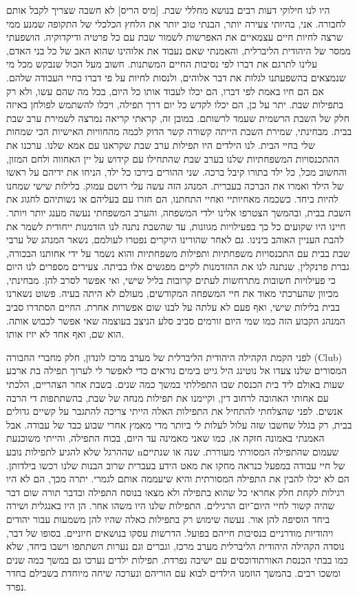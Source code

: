 \documentclass[14pt, article, extrafontsizes, twopage, a4paper]{memoir}
\begin{document}
היו לנו חילוקי דעות רבים בנושא מחללי שבת. [מיס הריס] לא חשבה שצריך לקבל אותם לחבורה. אני, בהיותי צעירה יותר, הבנתי טוב יותר את הלחץ הכלכלי של התקופה שמנע ממי שרצה לחיות חיים עצמאיים את האפרשות לשמור שבת עם כל פרטיה ודיקדוקיה. הושפעתי ממסר של היהודית הליברלית, והאמנתי שאם נעבוד את אלוהינו שהוא האב של כל בני האדם, עלינו לתרגם את דברו לפי נסיבות החיים המשתנות. חשוב מעל הכול שנבקש מכל מי שנמצאים בהשפעתנו לגלות את דבר אלוהים, ולנסות לחיות על פי דברו בחיי העבודה שלהם. אם הם חיו באמת לפי דברו, הם יכלו לעבוד אותו כל היום, בכל מה שהם עשו, ולא רק בתפילות שבת. יתר על כן, הם יכלו לקדש כל יום דרך תפילה, ויכלו להשתמש לפולחן באיזה חלק של השבת הרשמית שעמד לרשותם. במובן זה, קראתי קריאה נמרצה לשמירת ערב שבת בבית. מבחינתי, שמירת השבת הייתה קשורה קשר הדוק לכמה מהחוויות האישיות הכי שמחות שלי בחיי הבית. לנו הילדים היו תפילות ערב שבת שקראנו עם אמא שלנו. ערכנו את ההתכנסויות המשפחתיות שלנו בערב שבת שהתחילו עם קידוש על יין האחווה ולחם המזון, והחשוב מכל, כל ילד בתורו קיבל ברכה. שני ההורים בירכו כל ילד, הניחו את ידיהם על ראשו של הילד ואמרו את הברכה בעברית. המנהג הזה עשה עלי רושם עמוק. בלילות שישי שמחנו להיות ביחד. כשכמה מאחיותיי ואחיי התחתנו, הם חזרו עם בעליהם או נשותיהם לחגוג את השבת בבית, ובהמשך הצטרפו אלינו ילדי המשפחה, והערב המשפחתי נעשה מענג יותר ויותר. חיינו היו שקועים כל כך בפעילויות מגוונות, עד שהשבת נתנה לנו הזדמנות ייחודית לשמר את להבת העניין האוהב בינינו. גם לאחר שהורינו היקרים נפטרו לעולמם, נשאר המנהג של ערבי שבת בבית עם התכנסויות משפחתיות ותפילות משפחתיות והוא נשמר על ידי אחותנו הבכורה, גברת פרנקלין, שנתנה לנו את ההזדמנות לקיים מפגשים אלו בביתה. צעירים מספרים לנו היום כי פעילויות חשובות מתרחשות לעתים קרובות בליל שישי, ואי אפשר לסרב להן. מבחינתי, מכיוון שהערכתי מאוד את חיי המשפחה המקודשים, מעולם לא היתה בעיה. פשוט נשארנו בבית בלילות שישי, ואף פעם לא עלתה על לבנו שום אפשרות אחרת. החיים הסתדרו סביב המנהג הקבוע הזה כמו שמי היום זורמים סביב סלע הניצב בעוצמה שאי אפשר לכבוש אותה. הוא שם, ואף אחד לא יזיז אותו.

לפני הקמת הקהילה היהודית הליברלית של מערב מרכז לונדון, חלק מחברי החבורה (\textenglish{Club}) המסורים שלנו צעדו אל נוטינג היל גייט בימים נוראים כדי לאפשר לי לערוך תפילה בת ארבע שעות באולם ליד בית הכנסת שבו התפללתי במשך כמה שנים. בשבת אחר הצהריים, הלכתי עם אחותי האהובה לרחוב דין, וקיימנו את תפילות מנחה של שבת, בהשתתפות די הרבה אנשים. לפני שהצלחתי להתחיל את התפילות האלה הייתי צריכה להתגבר על קשיים גדולים בבית, רק בגלל שחשבו שזה עלול לעלות לי ביותר מדי מאמץ אחרי שבוע כבד של עבודה. אבל האמנתי באמונה חזקה אז, כמו שאני מאמינה עד היום, בכוח התפילה, והייתי משוכנעת שההרגל שלא להגיע לתפילות נובע nשעמום שהתפילה המסורתי מעוררת. שנה או שנתיים של חיי עבודה  במפעל כנראה מחקו את מאט הידע בעברית שרוב הבנות שלנו רכשו בילדותן. הם לא יכלו להבין את התפילה המסורתית והיא שיעממה אותם לגמרי. יתרה מכך, הם לא היו רגילות לקחת חלק אחראי כל שהוא בתפילה ולא מצאו בנוסח התפילה ובדבר תורה שום דבר שהיה קשור לחיי היום־יום הרגילים. התפילות שלנו היו משהו אחר. הן היו באנגלית ושירה ביחד הוסיפה להן אור. נעשה שימוש רק בתפילות כאלה שהיו להן משמעות עבור יהודים ויהודיות מודרניים בנסיבות חייהם בפועל. הדרשות עסקו בנושאים חיוניים. בסופו של דבר, נוסדה הקהילה היהודית הליברלית מערב מרכז, וגברים וגם נערות השתתפו וישבו ביחד, שלא כמו בבתי הכנסת האורתודוכסים  עם ישיבה נפרדת. תפילות ילדים נערכו גם במשך כמה שנים ומשכו רבים. בהמשך הוזמנו הילדים לבוא עם הוריהם ונערכה שיחה מיוחדת בשבילם בחדר נפרד.
\end{document}
